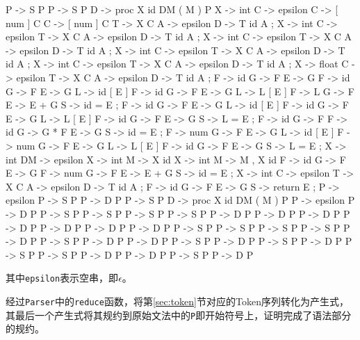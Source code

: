 \documentclass{ML}
\begin{document}
\begin{multicols}{2}
\begin{textcode}
    P -> S P
    P -> S P
    D -> proc X id DM ( M ) { P }
    X -> int
    C -> epsilon
    C -> [ num ] C
    C -> [ num ] C
    T -> X C
    A -> epsilon
    D -> T id A ;
    X -> int
    C -> epsilon
    T -> X C
    A -> epsilon
    D -> T id A ;
    X -> int
    C -> epsilon
    T -> X C
    A -> epsilon
    D -> T id A ;
    X -> int
    C -> epsilon
    T -> X C
    A -> epsilon
    D -> T id A ;
    X -> int
    C -> epsilon
    T -> X C
    A -> epsilon
    D -> T id A ;
    X -> float
    C -> epsilon
    T -> X C
    A -> epsilon
    D -> T id A ;
    F -> id
    G -> F
    E -> G
    F -> id
    G -> F
    E -> G
    L -> id [ E ]
    F -> id
    G -> F
    E -> G
    L -> L [ E ]
    F -> L
    G -> F
    E -> E + G
    S -> id = E ;
    F -> id
    G -> F
    E -> G
    L -> id [ E ]
    F -> id
    G -> F
    E -> G
    L -> L [ E ]
    F -> id
    G -> F
    E -> G
    S -> L = E ;
    F -> id
    G -> F
    F -> id
    G -> G * F
    E -> G
    S -> id = E ;
    F -> num
    G -> F
    E -> G
    L -> id [ E ]
    F -> num
    G -> F
    E -> G
    L -> L [ E ]
    F -> id
    G -> F
    E -> G
    S -> L = E ;
    X -> int
    DM -> epsilon
    X -> int
    M -> X id
    X -> int
    M -> M , X id
    F -> id
    G -> F
    E -> G
    F -> num
    G -> F
    E -> E + G
    S -> id = E ;
    X -> int
    C -> epsilon
    T -> X C
    A -> epsilon
    D -> T id A ;
    F -> id
    G -> F
    E -> G
    S -> return E ;
    P -> epsilon
    P -> S P
    P -> D P
    P -> S P
    D -> proc X id DM ( M ) { P }
    P -> epsilon
    P -> D P
    P -> S P
    P -> S P
    P -> S P
    P -> S P
    P -> D P
    P -> D P
    P -> D P
    P -> D P
    P -> D P
    P -> D P
    P -> D P
    P -> S P
    P -> S P
    P -> S P
    P -> S P
    P -> D P
    P -> S P
    P -> D P
    P -> D P
    P -> S P
    P -> D P
    P -> S P
    P -> D P
    P -> S P
    P -> S P
    P -> D P
    P -> D P
    P -> S P
    P -> D P
\end{textcode}
\end{multicols}
其中\texttt{epsilon}表示空串，即$\epsilon$。

经过\texttt{Parser}中的\texttt{reduce}函数，将第\ref{sec:token}节对应的Token序列转化为产生式，其最后一个产生式将其规约到原始文法中的\texttt{P}即开始符号上，证明完成了语法部分的规约。
\end{document}
